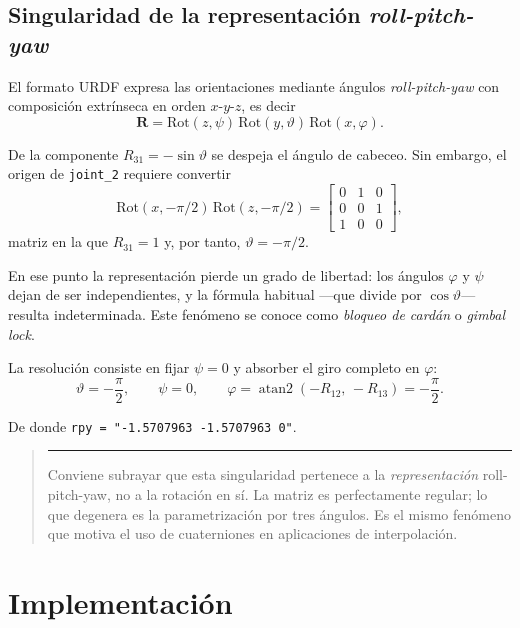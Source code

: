 \documentclass[11pt,a4paper]{article}
\newcommand{\mat}[1]{\mathbf{#1}}
\newenvironment{nota}
  {\begin{quote}\small\color{oscuro}\rule{2pt}{\baselineskip}\hspace{6pt}\ignorespaces}
  {\end{quote}}
\begin{document}
\subsection{Singularidad de la representación \emph{roll-pitch-yaw}}
\label{sec:gimbal}

El formato URDF expresa las orientaciones mediante ángulos
\emph{roll-pitch-yaw} con composición extrínseca en orden $x$-$y$-$z$,
es decir
\begin{equation}
\mat{R} = \mathrm{Rot}(z,\psi)\,\mathrm{Rot}(y,\vartheta)\,\mathrm{Rot}(x,\varphi).
\end{equation}

De la componente $R_{31} = -\sin\vartheta$ se despeja el ángulo de
cabeceo. Sin embargo, el origen de \texttt{joint\_2} requiere convertir
\begin{equation}
\mathrm{Rot}(x,-\pi/2)\,\mathrm{Rot}(z,-\pi/2) =
\begin{bmatrix}
0 & 1 & 0\\
0 & 0 & 1\\
1 & 0 & 0
\end{bmatrix},
\end{equation}
matriz en la que $R_{31} = 1$ y, por tanto, $\vartheta = -\pi/2$.

En ese punto la representación pierde un grado de libertad: los ángulos
$\varphi$ y $\psi$ dejan de ser independientes, y la fórmula habitual
—que divide por $\cos\vartheta$— resulta indeterminada. Este fenómeno se
conoce como \emph{bloqueo de cardán} o \emph{gimbal lock}.

La resolución consiste en fijar $\psi = 0$ y absorber el giro completo
en $\varphi$:
\begin{equation}
\vartheta = -\frac{\pi}{2},\qquad
\psi = 0,\qquad
\varphi = \operatorname{atan2}(-R_{12},\,-R_{13}) = -\frac{\pi}{2}.
\end{equation}

De donde \texttt{rpy = "-1.5707963 -1.5707963 0"}.

\begin{nota}
Conviene subrayar que esta singularidad pertenece a la
\emph{representación} roll-pitch-yaw, no a la rotación en sí. La matriz
es perfectamente regular; lo que degenera es la parametrización por tres
ángulos. Es el mismo fenómeno que motiva el uso de cuaterniones en
aplicaciones de interpolación.
\end{nota}

\section{Implementación}
\end{document}
